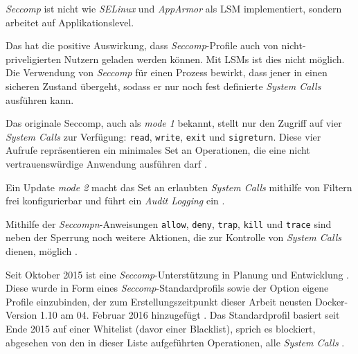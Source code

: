 \documentclass[../main.tex]{subfiles}
\begin{document}
			\emph{Seccomp} ist nicht wie \emph{SELinux} und \emph{AppArmor} als LSM implementiert, sondern arbeitet auf Applikationslevel.

			Das hat die positive Auswirkung, dass \emph{Seccomp}-Profile auch von nicht-priveligierten Nutzern geladen werden können. Mit LSMs ist dies nicht möglich.
			Die Verwendung von \emph{Seccomp} für einen Prozess bewirkt, dass jener in einen \glqq{}sicheren\grqq{} Zustand übergeht, sodass er nur noch fest definierte \emph{System Calls} ausführen kann.



			Das originale Seccomp, auch als \emph{mode 1} bekannt, stellt nur den Zugriff auf vier \emph{System Calls} zur Verfügung: \texttt{read}, \texttt{write}, \texttt{exit} und \texttt{sigreturn}. Diese vier Aufrufe repräsentieren ein minimales Set an Operationen, die eine nicht vertrauenswürdige Anwendung ausführen darf \cite{linuxSecOverview}.

			Ein Update \emph{mode 2} macht das Set an erlaubten \emph{System Calls} mithilfe von Filtern frei konfigurierbar und führt ein \emph{Audit Logging} ein	\cite{linuxSecOverview}\cite{seccompGitDesc}.

			Mithilfe der \emph{Seccompn}-Anweisungen \texttt{allow}, \texttt{deny}, \texttt{trap}, \texttt{kill} und \texttt{trace} sind neben der Sperrung noch weitere Aktionen, die zur Kontrolle von \emph{System Calls} dienen, möglich \cite{docker110Security}.

			Seit Oktober 2015 ist eine \emph{Seccomp}-Unterstützung in Planung und Entwicklung \cite{githubGeneralSecProfiles}\cite{githubSeccompIntegration}. Diese wurde in Form eines \emph{Seccomp}-Standardprofils sowie der Option eigene Profile einzubinden, der zum Erstellungszeitpunkt dieser Arbeit neusten Docker-Version 1.10 am 04. Februar 2016 hinzugefügt \cite{githubDockerChangelog}\cite{githubSeccompDoc}
			\cite{githubSeccompProfile}\cite{docker110Security}. Das Standardprofil basiert seit Ende 2015 auf einer Whitelist (davor einer Blacklist), sprich es blockiert, abgesehen von den in dieser Liste aufgeführten Operationen, alle \emph{System Calls} \cite{githubSeccompDoc}.
\end{document}
